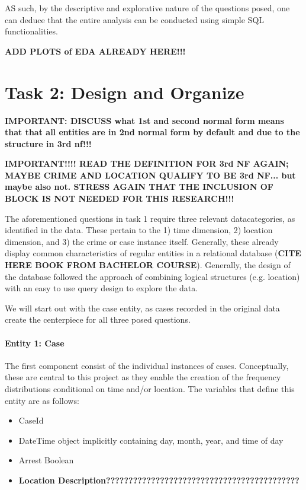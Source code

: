 \documentclass[a4paper]{article}
\begin{document}
AS such, by the descriptive and explorative nature of the questions posed, one can deduce that the entire analysis can be conducted using simple SQL functionalities.

\textbf{ADD PLOTS of EDA ALREADY HERE!!!}


\section{Task 2: Design and Organize}
\textbf{IMPORTANT: DISCUSS what 1st and second normal form means that that all entities are in 2nd normal form by default and due to the structure in 3rd nf!!!}


\textbf{IMPORTANT!!!! READ THE DEFINITION FOR 3rd NF AGAIN; MAYBE CRIME AND LOCATION QUALIFY TO BE 3rd NF... but maybe also not. STRESS AGAIN THAT THE INCLUSION OF BLOCK IS NOT NEEDED FOR THIS RESEARCH!!!}

The aforementioned questions in task 1 require three relevant datacategories, as identified in the data. These pertain to the 1) time dimension, 2) location dimension, and 3) the crime or case instance itself. Generally, these already display common characteristics of regular entities in a relational database (\textbf{CITE HERE BOOK FROM BACHELOR COURSE}). Generally, the design of the database followed the approach of combining logical structures (e.g. location) with an easy to use query design to explore the data.

We will start out with the case entity, as cases recorded in the original data create the centerpiece for all three posed questions.



\paragraph{Entity 1: Case} The first component consist of the individual instances of cases. Conceptually, these are central to this project as they enable the creation of the frequency distributions conditional on time and/or location. The variables that define this entity are as follows:

\begin{itemize}
  \item CaseId
  \item DateTime object implicitly containing day, month, year, and time of day 
  \item Arrest Boolean  
\item \textbf{Location Description???????????????????????????????????????????}
\end{itemize}
 
\end{document}
